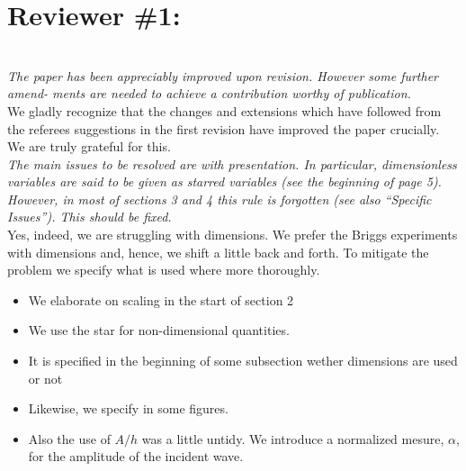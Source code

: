 \documentclass[11pt]{article}
\begin{document}
\newcommand{\refpoint}[1]{\ \vspace{0.3cm}\\ {\em #1}\  \vspace{0.3cm}\\ }
\newcommand{\refit}[1]{\em #1}
\newcommand{\refitem}[1]{\item {\em #1} }
\newcommand{\todo}[1]{\ \\ {\bf To do: #1}\\}
\section*{Reviewer \#1:} 
\refpoint{The paper has been appreciably improved upon revision. However some further amend-
ments are needed to achieve a contribution worthy of publication.}
We gladly recognize that the changes and extensions which have followed from the referees suggestions 
in the first revision have improved the paper crucially. We are truly grateful for this. 
\refpoint{The main issues to be resolved are with presentation. In particular, dimensionless
variables are said to be given as starred variables (see the beginning of page 5). However,
in most of sections 3 and 4 this rule is forgotten (see also “Specific Issues”). This should
be fixed.}
Yes, indeed, we are struggling with dimensions. We prefer the Briggs experiments with dimensions and, hence, we shift a little back and forth.
To mitigate the problem we specify what is used where more thoroughly.
\begin{itemize}
\item We elaborate on scaling in the start of section 2
\item We use the star for non-dimensional quantities. 
\item It is specified in the beginning of some subsection wether dimensions are used or not
\item Likewise, we specify in some figures.
\item Also the use of $A/h$ was a little untidy. We introduce a normalized mesure, $\alpha$, for
the amplitude of the incident wave.
\end{itemize}
    
\end{document}
